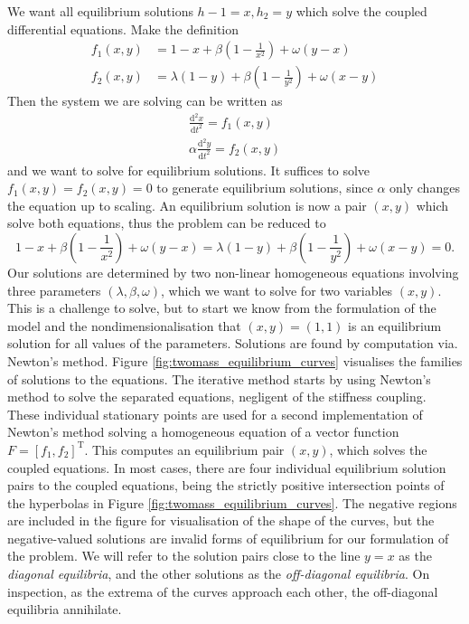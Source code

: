 \documentclass{article}
\begin{document}
We want all equilibrium solutions \(h-1 = x, h_2 = y\) which solve the coupled differential equations.
Make the definition
\begin{equation}
    \begin{aligned}
        f_1(x,y) &= 1-x + \beta\left(1 - \frac{1}{x^2}\right) + \omega(y-x) \\
        f_2(x,y) &= \lambda(1-y) + \beta\left(1 - \frac{1}{y^2}\right) + \omega(x-y)
        \label{eqn:twomass_equilibrium_functions}
    \end{aligned}
\end{equation}
Then the system we are solving can be written as
\begin{equation}
    \begin{aligned}
        \frac{\mathrm{d}^2x}{\mathrm{d}t^2} = f_1(x,y) \\
        \alpha\frac{\mathrm{d}^2y}{\mathrm{d}t^2} = f_2(x,y)
        \label{eqn:twomass_slave}  
    \end{aligned}
\end{equation}
and we want to solve for equilibrium solutions. It suffices to solve \(f_1(x,y) = f_2(x,y) = 0\) to generate equilibrium solutions,
since \(\alpha\) only changes the equation up to scaling. 
An equilibrium solution is now a pair \((x,y)\) which solve both equations,
thus the problem can be reduced to
\begin{equation}
    1-x + \beta\left(1 - \frac{1}{x^2}\right) + \omega(y-x) = \lambda(1-y) + \beta\left(1 - \frac{1}{y^2}\right) + \omega(x-y) = 0.
    \label{eqn:twomass_noalpha_equilibrium_solutions}
\end{equation}
Our solutions are determined by two non-linear homogeneous equations involving three parameters \((\lambda, \beta, \omega)\), which we want to solve for two variables \((x,y)\).
This is a challenge to solve, but to start we know from the formulation of the model and the nondimensionalisation that \((x,y) = (1,1)\) is an equilibrium solution for all values of the parameters.
Solutions are found by computation via. Newton's method.
Figure \ref{fig:twomass_equilibrium_curves} visualises the families of solutions to the equations.
The iterative method starts by using Newton's method to solve the separated equations, negligent of the stiffness coupling.
These individual stationary points are used for a second implementation of Newton's method solving a homogeneous equation of a vector function \(F = [f_1, f_2]^\mathrm{T}\).
This computes an equilibrium pair \((x,y)\), which solves the coupled equations. %
In most cases, there are four individual equilibrium solution pairs to the coupled equations,
being the strictly positive intersection points of the hyperbolas in Figure \ref{fig:twomass_equilibrium_curves}.
The negative regions are included in the figure for visualisation of the shape of the curves,
but the negative-valued solutions are invalid forms of equilibrium for our formulation of the problem.
We will refer to the solution pairs close to the line $y=x$ as the \textit{diagonal equilibria},
and the other solutions as the \textit{off-diagonal equilibria}.
On inspection, as the extrema of the curves approach each other,
the off-diagonal equilibria annihilate.
\end{document}
